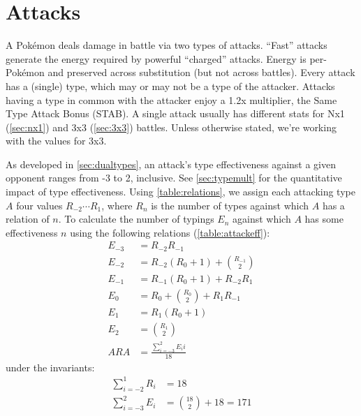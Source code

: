 \chapter{Attacks}
\label{chap:attacks}
A Pokémon deals damage in battle via two types of attacks.
``Fast'' attacks generate the energy required by powerful ``charged'' attacks.
Energy is per-Pokémon and preserved across substitution (but not across battles).
Every attack has a (single) type, which may or may not be a type of the attacker.
Attacks having a type in common with the attacker enjoy a 1.2x multiplier, the Same Type Attack Bonus (STAB).
A single attack usually has different stats for Nx1 (\autoref{sec:nx1})
  and 3x3 (\autoref{sec:3x3}) battles.
Unless otherwise stated, we're working with the values for 3x3.

As developed in \autoref{sec:dualtypes}, an attack's type effectiveness
  against a given opponent ranges from -3 to 2, inclusive.
See \autoref{sec:typemult} for the quantitative impact of type effectiveness.
Using \autoref{table:relations}, we assign each attacking type $A$ four values
  $R_{-2}\cdots{}R_1$, where $R_n$ is the number of types against which $A$ has a
  relation of $n$.
To calculate the number of typings $E_n$ against which $A$ has some effectiveness $n$
  using the following relations (\autoref{table:attackeff}):
\begin{align*}
  E_{-3} &= R_{-2}R_{-1}\\
  E_{-2} &= R_{-2}(R_0 + 1) + \binom{R_{-1}}{2}\\
  E_{-1} &= R_{-1}(R_0 + 1) + R_{-2}R_1\\
   E_{0} &= R_0 + \binom{R_0}{2} + R_{1}R_{-1}\\
   E_{1} &= R_{1}(R_0 + 1)\\
   E_{2} &= \binom{R_1}{2}\\
   ARA &= \frac{\sum_{i=-3}^{2} E_{i}i}{18}
\end{align*}
under the invariants:
\begin{align*}
    \sum_{i=-2}^{1} R_i &= 18\\
   \sum_{i=-3}^{2} E_i &= \binom{18}{2} + 18  = 171
\end{align*}
